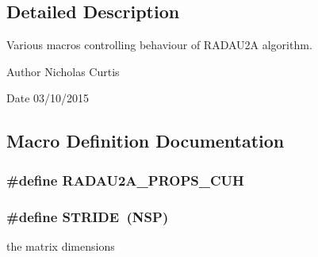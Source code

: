 \subsection{Detailed Description}
Various macros controlling behaviour of R\+A\+D\+A\+U2A algorithm. 

\begin{DoxyAuthor}{Author}
Nicholas Curtis 
\end{DoxyAuthor}
\begin{DoxyDate}{Date}
03/10/2015 
\end{DoxyDate}


\subsection{Macro Definition Documentation}
\subsubsection[{\texorpdfstring{R\+A\+D\+A\+U2\+A\+\_\+\+P\+R\+O\+P\+S\+\_\+\+C\+UH}{RADAU2A_PROPS_CUH}}]{\setlength{\rightskip}{0pt plus 5cm}\#define R\+A\+D\+A\+U2\+A\+\_\+\+P\+R\+O\+P\+S\+\_\+\+C\+UH}\hypertarget{radau2a__props_8cuh_acb5834e026c7d7045b16acfcb25a5f7d}{}\label{radau2a__props_8cuh_acb5834e026c7d7045b16acfcb25a5f7d}
\subsubsection[{\texorpdfstring{S\+T\+R\+I\+DE}{STRIDE}}]{\setlength{\rightskip}{0pt plus 5cm}\#define S\+T\+R\+I\+DE~(N\+SP)}\hypertarget{radau2a__props_8cuh_a351d54267048643c4365f6a24641d0cf}{}\label{radau2a__props_8cuh_a351d54267048643c4365f6a24641d0cf}


the matrix dimensions 


